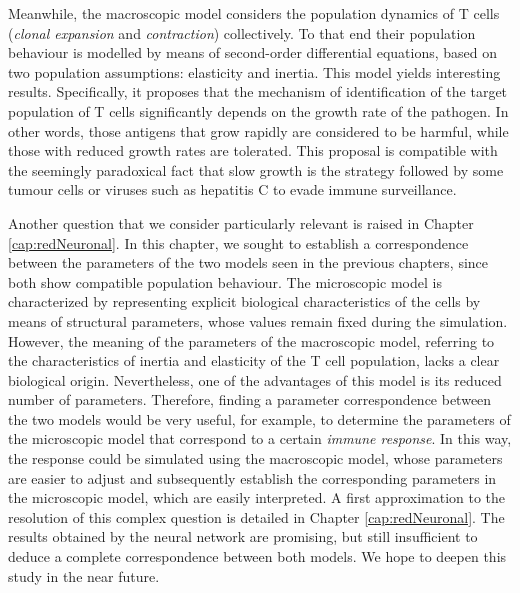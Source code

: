 Meanwhile, the macroscopic model considers the population dynamics of T cells (\textit{clonal expansion} and \textit{contraction}) collectively. To that end their population behaviour is modelled by means of second-order differential equations, based on two population assumptions: elasticity and inertia. This model yields interesting results. Specifically, it proposes that the mechanism of identification of the target population of T cells significantly depends on the growth rate of the pathogen. In other words, those antigens that grow rapidly are considered to be harmful, while those with reduced growth rates are tolerated. This proposal is compatible with the seemingly paradoxical fact that slow growth is the strategy followed by some tumour cells or viruses such as hepatitis C \citep{Crawford39.17, pmid23596300} to evade immune surveillance.


Another question that we consider particularly relevant is raised in Chapter \ref{cap:redNeuronal}. In this chapter, we sought to establish a correspondence between the parameters of the two models seen in the previous chapters, since both show compatible population behaviour. The microscopic model is characterized by representing explicit biological characteristics of the cells by means of structural parameters, whose values remain fixed during the simulation. However, the meaning of the parameters of the macroscopic model, referring to the characteristics of inertia and elasticity of the T cell population, lacks a clear biological origin. Nevertheless, one of the advantages of this model is its reduced number of parameters. Therefore, finding a parameter correspondence between the two models would be very useful, for example, to determine the parameters of the microscopic model that correspond to a certain \textit{immune response}. In this way, the response could be simulated using the macroscopic model, whose parameters are easier to adjust and subsequently establish the corresponding parameters in the microscopic model, which are easily interpreted. A first approximation to the resolution of this complex question is detailed in Chapter \ref{cap:redNeuronal}. The results obtained by the neural network are promising, but still insufficient to deduce a complete correspondence between both models. We hope to deepen this study in the near future.


